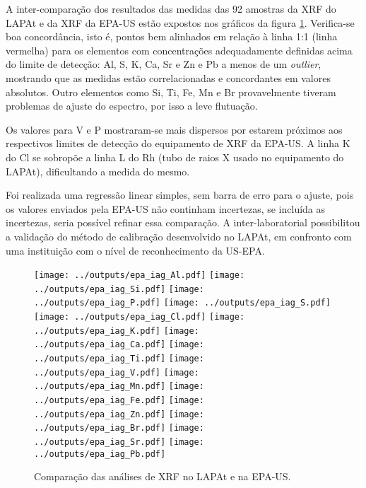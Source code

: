 A inter-comparação dos resultados das medidas das 92 amostras da XRF do LAPAt e 
da XRF da EPA-US estão expostos nos gráficos da figura \ref{fig:epa_lapat}. 
Verifica-se boa concordância, isto é, pontos bem alinhados
em relação à linha 1:1 (linha vermelha) para os elementos com 
concentrações adequadamente definidas acima do limite de detecção: Al, S, 
K, Ca, Sr e Zn e Pb a menos de um \textit{outlier}, mostrando que as medidas 
estão correlacionadas e concordantes em valores absolutos. Outro elementos como
Si, Ti, Fe, Mn e Br provavelmente tiveram problemas de ajuste do espectro, por 
isso a leve flutuação. 

Os valores para V e P mostraram-se mais dispersos por estarem próximos aos 
respectivos limites de detecção do equipamento de XRF da EPA-US. A linha K do Cl 
se sobropõe a linha L do Rh (tubo de raios X usado no equipamento do LAPAt), 
dificultando a medida do mesmo.   

Foi realizada uma regressão linear simples, sem barra de erro para o ajuste, 
pois os valores enviados pela EPA-US não continham incertezas, se incluída as 
incertezas, seria possível refinar essa comparação.  A inter-laboratorial 
possibilitou a validação do método de 
calibração desenvolvido no LAPAt, em confronto com uma instituição com o nível 
de reconhecimento da US-EPA.

\newpage
\begin{figure}[H]
  \centering
    \texttt{[image: ../outputs/epa\_iag\_Al.pdf]}
    \texttt{[image: ../outputs/epa\_iag\_Si.pdf]}
    \texttt{[image: ../outputs/epa\_iag\_P.pdf]}
    \texttt{[image: ../outputs/epa\_iag\_S.pdf]}
    \texttt{[image: ../outputs/epa\_iag\_Cl.pdf]}
    \texttt{[image: ../outputs/epa\_iag\_K.pdf]}
    \texttt{[image: ../outputs/epa\_iag\_Ca.pdf]}
    \texttt{[image: ../outputs/epa\_iag\_Ti.pdf]}
    \texttt{[image: ../outputs/epa\_iag\_V.pdf]}
    \texttt{[image: ../outputs/epa\_iag\_Mn.pdf]}
    \texttt{[image: ../outputs/epa\_iag\_Fe.pdf]}
    \texttt{[image: ../outputs/epa\_iag\_Zn.pdf]}
    \texttt{[image: ../outputs/epa\_iag\_Br.pdf]}
    \texttt{[image: ../outputs/epa\_iag\_Sr.pdf]}
    \texttt{[image: ../outputs/epa\_iag\_Pb.pdf]}
  \caption{Comparação das análises de XRF no LAPAt e na EPA-US. 
           \label{fig:epa_lapat}}
\end{figure}
